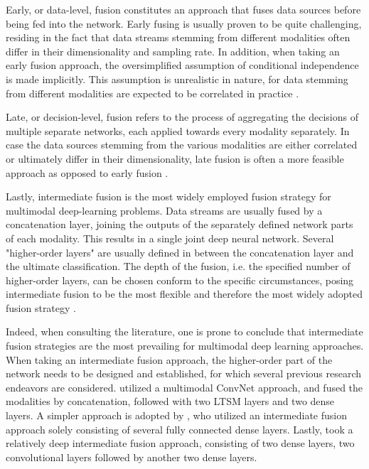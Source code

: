 \documentclass[12pt]{article}
\begin{document}
Early, or data-level, fusion constitutes an approach that fuses data sources before being fed into the network. Early fusing is usually proven to be quite challenging, residing in the fact that data streams stemming from different modalities often differ in their dimensionality and sampling rate. In addition, when taking an early fusion approach, the oversimplified assumption of conditional independence is made implicitly. This assumption is unrealistic in nature, for data stemming from different modalities are expected to be correlated in practice \cite{ramachandram2017deep}. 

Late, or decision-level, fusion refers to the process of aggregating the decisions of multiple separate networks, each applied towards every modality separately. In case the data sources stemming from the various modalities are either correlated or ultimately differ in their dimensionality, late fusion is often a more feasible approach as opposed to early fusion \cite{ramachandram2017deep}.

Lastly, intermediate fusion is the most widely employed fusion strategy for multimodal deep-learning problems. Data streams are usually fused by a concatenation layer, joining the outputs of the separately defined network parts of each modality. This results in a single joint deep neural network. Several "higher-order layers" are usually defined in between the concatenation layer and the ultimate classification. The depth of the fusion, i.e. the specified number of higher-order layers, can be chosen conform to the specific circumstances, posing intermediate fusion to be the most flexible and therefore the most widely adopted fusion strategy \cite{ramachandram2017deep}.

Indeed, when consulting the literature, one is prone to conclude that intermediate fusion strategies are the most prevailing for multimodal deep learning approaches. When taking an intermediate fusion approach, the higher-order part of the network needs to be designed and established, for which several previous research endeavors are considered.   utilized a multimodal ConvNet approach, and fused the modalities by concatenation, followed with two LTSM layers and two dense layers. A simpler approach is adopted by , who utilized an intermediate fusion approach solely consisting of several fully connected dense layers. Lastly,  took a relatively deep intermediate fusion approach, consisting of two dense layers, two convolutional layers followed by another two dense layers.  
\end{document}
